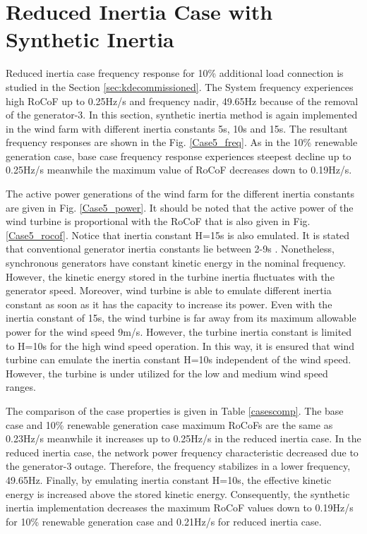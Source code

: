\section{Reduced Inertia Case with Synthetic Inertia}
Reduced inertia case frequency response for 10\% additional load connection is studied in the Section \ref{sec:kdecommissioned}. The System frequency experiences high RoCoF up to 0.25Hz/s and frequency nadir, 49.65Hz because of the removal of the generator-3. In this section, synthetic inertia method is again implemented in the wind farm with different inertia constants 5s, 10s and 15s. The resultant frequency responses are shown in the Fig. \ref{Case5_freq}. As in the 10\% renewable generation case, base case frequency response experiences steepest decline up to 0.25Hz/s meanwhile the maximum value of RoCoF decreases down to 0.19Hz/s. \par
The active power generations of the wind farm for the different inertia constants are given in Fig. \ref{Case5_power}. It should be noted that the active power of the wind turbine is proportional with the RoCoF that is also given in Fig. \ref{Case5_rocof}. Notice that inertia constant H=15s is also emulated. It is stated that conventional generator inertia constants lie between 2-9s \cite{Kundur}. Nonetheless, synchronous generators have constant kinetic energy in the nominal frequency. However, the kinetic energy stored in the turbine inertia fluctuates with the generator speed. Moreover, wind turbine is able to emulate different inertia constant as soon as it has the capacity to increase its power. Even with the inertia constant of 15s, the wind turbine is far away from its maximum allowable power for the wind speed 9m/s. However, the turbine inertia constant is limited to H=10s for the high wind speed operation. In this way, it is ensured that wind turbine can emulate the inertia constant H=10s independent of the wind speed. However, the turbine is under utilized for the low and medium wind speed ranges.\par
The comparison of the case properties is given in Table \ref{casescomp}. The base case and 10\% renewable generation case maximum RoCoFs are the same as 0.23Hz/s meanwhile it increases up to 0.25Hz/s in the reduced inertia case. In the reduced inertia case, the network power frequency characteristic decreased due to the generator-3 outage. Therefore, the frequency stabilizes in a lower frequency, 49.65Hz. Finally, by emulating inertia constant H=10s, the effective kinetic energy is increased above the stored kinetic energy. Consequently, the synthetic inertia implementation decreases the maximum RoCoF values down to 0.19Hz/s for 10\% renewable generation case and 0.21Hz/s for reduced inertia case.
